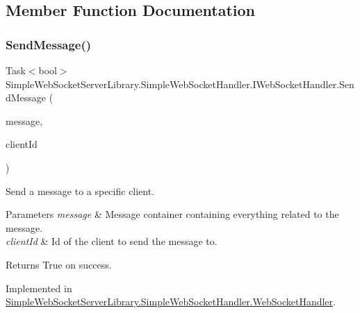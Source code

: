 \subsection{Member Function Documentation}
\mbox{\label{interface_simple_web_socket_server_library_1_1_simple_web_socket_handler_1_1_i_web_socket_handler_a3d9b246d14117c85014486b3f5bb71c8}} 
\subsubsection{\texorpdfstring{Send\+Message()}{SendMessage()}\hspace{0.1cm}{\footnotesize\ttfamily [1/2]}}
{\footnotesize\ttfamily Task$<$bool$>$ Simple\+Web\+Socket\+Server\+Library.\+Simple\+Web\+Socket\+Handler.\+I\+Web\+Socket\+Handler.\+Send\+Message (\begin{DoxyParamCaption}\item[{\mbox{\hyperlink{class_simple_web_socket_server_library_1_1_web_socket_message_container}{Web\+Socket\+Message\+Container}}}]{message,  }\item[{string}]{client\+Id }\end{DoxyParamCaption})}



Send a message to a specific client. 


\begin{DoxyParams}{Parameters}
{\em message} & Message container containing everything related to the message.\\
\hline
{\em client\+Id} & Id of the client to send the message to.\\
\hline
\end{DoxyParams}
\begin{DoxyReturn}{Returns}
True on success.
\end{DoxyReturn}


Implemented in \mbox{\hyperlink{class_simple_web_socket_server_library_1_1_simple_web_socket_handler_1_1_web_socket_handler_abee1c137ad80d04fb2a1de7644d2d60d}{Simple\+Web\+Socket\+Server\+Library.\+Simple\+Web\+Socket\+Handler.\+Web\+Socket\+Handler}}.

